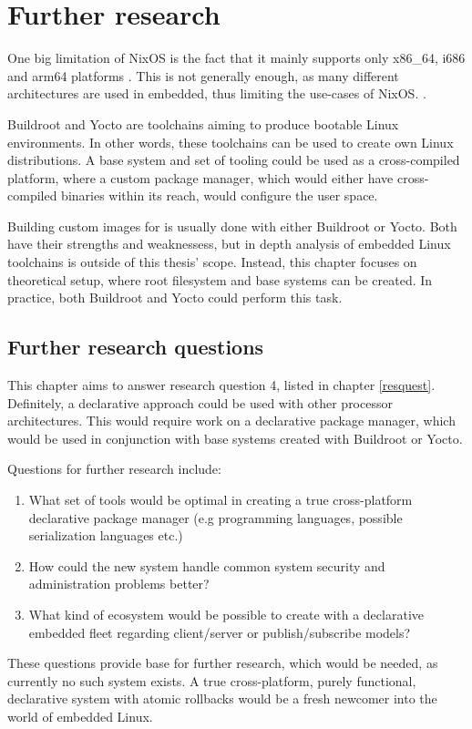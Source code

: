 \chapter{Further research} \label{further}

One big limitation of NixOS is the fact that it mainly supports only x86\_64, i686 and arm64 platforms \cite{nixosNixOSManual}. This is not generally enough, as many different architectures are used in embedded, thus limiting the use-cases of NixOS. \cite{fysarakis2014embedded}.

Buildroot and Yocto are toolchains aiming to produce bootable Linux environments. In other words, these toolchains can be used to create own Linux distributions. A base system and set of tooling could be used as a cross-compiled platform, where a custom package manager, which would either have cross-compiled binaries within its reach, would configure the user space.

Building custom images for is usually done with either Buildroot or Yocto. Both have their strengths and weaknessess, but in depth analysis of embedded Linux toolchains is outside of this thesis' scope. Instead, this chapter focuses on theoretical setup, where root filesystem and base systems can be created. In practice, both Buildroot and Yocto could perform this task. \cite{vasquez2021mastering}

\section{Further research questions}

This chapter aims to answer research question 4, listed in chapter \ref{resquest}. Definitely, a declarative approach could be used with other processor architectures. This would require work on a declarative package manager, which would be used in conjunction with base systems created with Buildroot or Yocto.

Questions for further research include:
\begin{enumerate}
    \item What set of tools would be optimal in creating a true cross-platform declarative package manager (e.g programming languages, possible serialization languages etc.)

    \item How could the new system handle common system security and administration problems better?

    \item What kind of ecosystem would be possible to create with a declarative embedded fleet regarding client/server or publish/subscribe models?
\end{enumerate}


These questions provide base for further research, which would be needed, as currently no such system exists. A true cross-platform, purely functional, declarative system with atomic rollbacks would be a fresh newcomer into the world of embedded Linux.